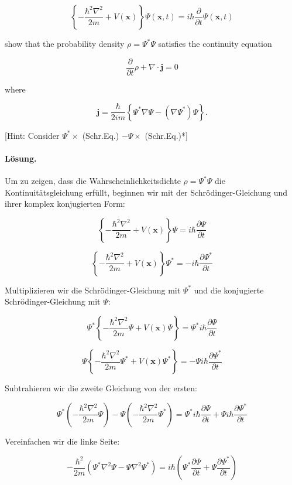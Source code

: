 \documentclass[11pt,a4paper]{article}
\begin{document}
$$
\left\{-\frac{\hbar^2 \nabla^2}{2 m}+V(\mathbf{x})\right\} \Psi(\mathbf{x}, t)=i \hbar \frac{\partial}{\partial t} \Psi(\mathbf{x}, t)
$$

show that the probability density $\rho=\Psi^* \Psi$ satisfies the continuity equation

$$
\frac{\partial}{\partial t} \rho+\nabla \cdot \mathbf{j}=0
$$

where

$$
\mathbf{j}=\frac{\hbar}{2 i m}\left\{\Psi^* \nabla \Psi-\left(\nabla \Psi^*\right) \Psi\right\} .
$$

[Hint: Consider $\Psi^* \times$ (Schr.Eq.) $-\Psi \times$ (Schr.Eq.)*]

\paragraph{Lösung.}
Um zu zeigen, dass die Wahrscheinlichkeitsdichte \(\rho = \Psi^* \Psi\) die Kontinuitätsgleichung erfüllt, beginnen wir mit der Schrödinger-Gleichung und ihrer komplex konjugierten Form:

\[
\left\{-\frac{\hbar^2 \nabla^2}{2 m} + V(\mathbf{x})\right\} \Psi = i \hbar \frac{\partial \Psi}{\partial t}
\]

\[
\left\{-\frac{\hbar^2 \nabla^2}{2 m} + V(\mathbf{x})\right\} \Psi^* = -i \hbar \frac{\partial \Psi^*}{\partial t}
\]

Multiplizieren wir die Schrödinger-Gleichung mit \(\Psi^*\) und die konjugierte Schrödinger-Gleichung mit \(\Psi\):

\[
\Psi^* \left\{-\frac{\hbar^2 \nabla^2}{2 m} \Psi + V(\mathbf{x}) \Psi\right\} = \Psi^* i \hbar \frac{\partial \Psi}{\partial t}
\]

\[
\Psi \left\{-\frac{\hbar^2 \nabla^2}{2 m} \Psi^* + V(\mathbf{x}) \Psi^*\right\} = -\Psi i \hbar \frac{\partial \Psi^*}{\partial t}
\]

Subtrahieren wir die zweite Gleichung von der ersten:

\[
\Psi^* \left(-\frac{\hbar^2 \nabla^2}{2 m} \Psi\right) - \Psi \left(-\frac{\hbar^2 \nabla^2}{2 m} \Psi^*\right) = \Psi^* i \hbar \frac{\partial \Psi}{\partial t} + \Psi i \hbar \frac{\partial \Psi^*}{\partial t}
\]

Vereinfachen wir die linke Seite:

\[
-\frac{\hbar^2}{2 m} \left(\Psi^* \nabla^2 \Psi - \Psi \nabla^2 \Psi^*\right) = i \hbar \left(\Psi^* \frac{\partial \Psi}{\partial t} + \Psi \frac{\partial \Psi^*}{\partial t}\right)
\]
\end{document}
